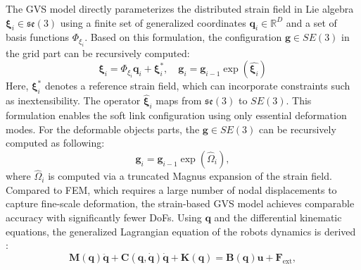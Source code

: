 \documentclass{article}
\begin{document}
The GVS model directly parameterizes the distributed strain field in  Lie algebra $\boldsymbol{\xi}_i \in \mathfrak{se}(3)$ using a finite set of generalized coordinates $\boldsymbol{q}_i \in \mathbb{R}^{D}$ and a set of basis functions $\Phi_{\xi_i}$. Based on this formulation, the configuration $\mathbf{g} \in SE(3)$ in the grid part can be recursively computed:
\begin{equation}
\boldsymbol{\xi}_i = \Phi_{\xi_i} \boldsymbol{q}_i + \boldsymbol{\xi}_i^*, \quad \mathbf{g}_i = \mathbf{g}_{i-1} \exp(\hat{\boldsymbol{\xi}_i})
\label{eq: grid}
\end{equation}
Here, $\boldsymbol{\xi}_i^*$ denotes a reference strain field, which can incorporate constraints such as inextensibility. The operator $\hat{\boldsymbol{\xi}}_i$ maps from $\mathfrak{se}(3)$ to $SE(3)$. This formulation enables the soft link configuration using only essential deformation modes. For the deformable objects parts, the $\mathbf{g} \in SE(3)$ can be recursively computed as following:
\begin{equation}
\mathbf{g}_i = \mathbf{g}_{i-1}\exp(\widehat{\Omega}_i),
\label{eq: soft}
\end{equation}
where $\widehat{\Omega}_i$ is computed via a truncated Magnus expansion of the strain field. Compared to FEM, which requires a large number of nodal displacements to capture fine-scale deformation, the strain-based GVS model achieves comparable accuracy with significantly fewer DoFs. Using $\boldsymbol{q}$ and the differential kinematic equations, the generalized Lagrangian equation of the robots dynamics is derived \cite{Anup2025reduced}:
\begin{equation}
\mathbf{M}(\boldsymbol{q}) \ddot{\boldsymbol{q}} + \mathbf{C}(\boldsymbol{q}, \dot{\boldsymbol{q}}) \dot{\boldsymbol{q}} + \mathbf{K}(\boldsymbol{q}) = \mathbf{B}(\boldsymbol{q}) \mathbf{u} + \mathbf{F}_{\text{ext}},
\end{equation}
\end{document}
